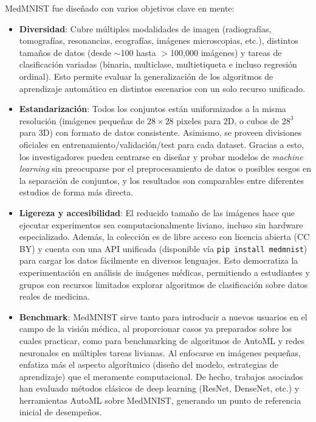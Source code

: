 \documentclass[11pt,spanish,listoffigures,listoftables]{tfgetsinf}
\begin{document}
MedMNIST \cite{Yang2022} fue diseñado con varios objetivos clave en mente:
\begin{itemize}
    \item \textbf{Diversidad}: Cubre múltiples modalidades de imagen (radiografías, tomografías, resonancias, ecografías, 
    imágenes microscopias, etc.), distintos tamaños de datos (desde $\sim$100 hasta $>$100,000 imágenes) y tareas de 
    clasificación variadas (binaria, multiclase, multietiqueta e incluso regresión ordinal). Esto permite evaluar la generalización 
    de los algoritmos de aprendizaje automático en distintos escenarios con un solo recurso unificado.
    
    \item \textbf{Estandarización}: Todos los conjuntos están uniformizados a la misma resolución (imágenes pequeñas de $28\times28$ 
    pixeles para 2D, o cubos de $28^3$ para 3D) con formato de datos consistente. Asimismo, se proveen divisiones oficiales en 
    entrenamiento/validación/test para cada dataset. Gracias a esto, los investigadores pueden centrarse en diseñar y probar 
    modelos de \textit{machine learning} sin preocuparse por el preprocesamiento de datos o posibles sesgos en la separación 
    de conjuntos, y los resultados son comparables entre diferentes estudios de forma más directa.
    
    \item \textbf{Ligereza y accesibilidad}:  El reducido tamaño de las imágenes hace que ejecutar experimentos sea computacionalmente 
    liviano, incluso sin hardware especializado. Además, la colección es de libre acceso con licencia abierta (CC BY) y cuenta con una 
    API unificada (disponible vía \texttt{pip install medmnist}) para cargar los datos fácilmente en diversos lenguajes. 
    Esto democratiza la experimentación en análisis de imágenes médicas, permitiendo a estudiantes y grupos con recursos limitados 
    explorar algoritmos de clasificación sobre datos reales de medicina.

    \item \textbf{Benchmark}: MedMNIST sirve tanto para introducir a nuevos usuarios en el campo de la visión médica, al 
    proporcionar casos ya preparados sobre los cuales practicar, como para benchmarking de algoritmos de AutoML y redes 
    neuronales en múltiples tareas livianas. Al enfocarse en imágenes pequeñas, enfatiza más el aspecto algorítmico 
    (diseño del modelo, estrategias de aprendizaje) que el meramente computacional. De hecho, trabajos asociados han 
    evaluado métodos clásicos de deep learning (ResNet, DenseNet, etc.) y herramientas AutoML sobre MedMNIST, generando 
    un punto de referencia inicial de desempeños.
\end{itemize}
\end{document}
